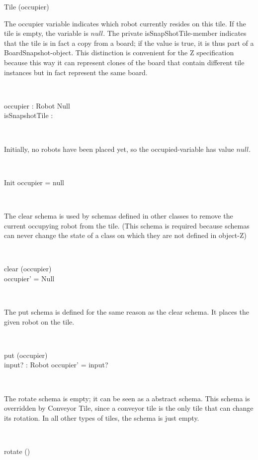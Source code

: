 \begin{class}{Tile}
\upharpoonright (occupier) \\
\begin{zpar}
The occupier variable indicates which robot currently resides on this tile. If the tile is empty, the variable is $null$. The private isSnapShotTile-member indicates that the tile is in fact a copy from a board; if the value is true, it is thus part of a BoardSnapshot-object. This distinction is convenient for the Z specification because this way it can represent clones of the board that contain different tile instances but in fact represent the same board.
\end{zpar} \\
\begin{state}
occupier : Robot \cup Null \\
isSnapshotTile : \bool \\
\end{state} \\
\begin{zpar}
Initially, no robots have been placed yet, so the occupied-variable has value $null$.
\end{zpar} \\
\begin{schema}{Init}
occupier = null
\end{schema} \\
\begin{zpar}
The clear schema is used by schemas defined in other classes to remove the current occupying robot from the tile. (This schema is required because schemas can never change the state of a class on which they are not defined in object-Z)
\end{zpar} \\
\begin{schema}{clear}
\Delta (occupier) \\
\where
occupier' = Null
\end{schema} \\
\znewpage
\begin{zpar}
The put schema is defined for the same reason as the clear schema. It places the given robot on the tile.
\end{zpar}\\
\begin{schema}{put}
\Delta (occupier) \\
input? : Robot
\where
occupier' = input?
\end{schema} \\
\begin{zpar}
The rotate schema is empty; it can be seen as a abstract schema. This schema is overridden by Conveyor Tile, since a conveyor tile is the only tile that can change its rotation. In all other types of tiles, the schema is just empty.
\end{zpar} \\
\begin{schema}{rotate}
\Delta()
\end{schema}
\end{class}

